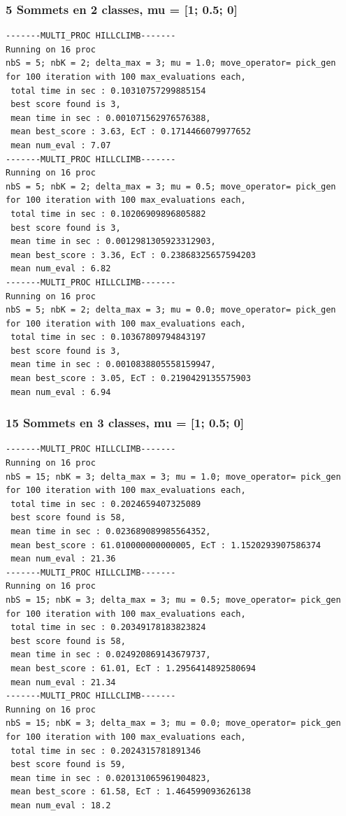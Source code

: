 \documentclass[a4paper]{article}
\begin{document}
\subsubsection{5 Sommets en 2 classes, mu = [1; 0.5; 0]}
\begin{verbatim}
-------MULTI_PROC HILLCLIMB-------
Running on 16 proc
nbS = 5; nbK = 2; delta_max = 3; mu = 1.0; move_operator= pick_gen
for 100 iteration with 100 max_evaluations each, 
 total time in sec : 0.10310757299885154
 best score found is 3,
 mean time in sec : 0.001071562976576388,
 mean best_score : 3.63, EcT : 0.1714466079977652
 mean num_eval : 7.07
-------MULTI_PROC HILLCLIMB-------
Running on 16 proc
nbS = 5; nbK = 2; delta_max = 3; mu = 0.5; move_operator= pick_gen
for 100 iteration with 100 max_evaluations each, 
 total time in sec : 0.10206909896805882
 best score found is 3,
 mean time in sec : 0.0012981305923312903,
 mean best_score : 3.36, EcT : 0.23868325657594203
 mean num_eval : 6.82
-------MULTI_PROC HILLCLIMB-------
Running on 16 proc
nbS = 5; nbK = 2; delta_max = 3; mu = 0.0; move_operator= pick_gen
for 100 iteration with 100 max_evaluations each, 
 total time in sec : 0.10367809794843197
 best score found is 3,
 mean time in sec : 0.0010838805558159947,
 mean best_score : 3.05, EcT : 0.2190429135575903
 mean num_eval : 6.94
\end{verbatim}
\subsubsection{15 Sommets en 3 classes, mu = [1; 0.5; 0]}
\begin{verbatim}
-------MULTI_PROC HILLCLIMB-------
Running on 16 proc
nbS = 15; nbK = 3; delta_max = 3; mu = 1.0; move_operator= pick_gen
for 100 iteration with 100 max_evaluations each, 
 total time in sec : 0.2024659407325089
 best score found is 58,
 mean time in sec : 0.023689089985564352,
 mean best_score : 61.010000000000005, EcT : 1.1520293907586374
 mean num_eval : 21.36
-------MULTI_PROC HILLCLIMB-------
Running on 16 proc
nbS = 15; nbK = 3; delta_max = 3; mu = 0.5; move_operator= pick_gen
for 100 iteration with 100 max_evaluations each, 
 total time in sec : 0.20349178183823824
 best score found is 58,
 mean time in sec : 0.024920869143679737,
 mean best_score : 61.01, EcT : 1.2956414892580694
 mean num_eval : 21.34
-------MULTI_PROC HILLCLIMB-------
Running on 16 proc
nbS = 15; nbK = 3; delta_max = 3; mu = 0.0; move_operator= pick_gen
for 100 iteration with 100 max_evaluations each, 
 total time in sec : 0.2024315781891346
 best score found is 59,
 mean time in sec : 0.020131065961904823,
 mean best_score : 61.58, EcT : 1.464599093626138
 mean num_eval : 18.2
\end{verbatim}
\end{document}
